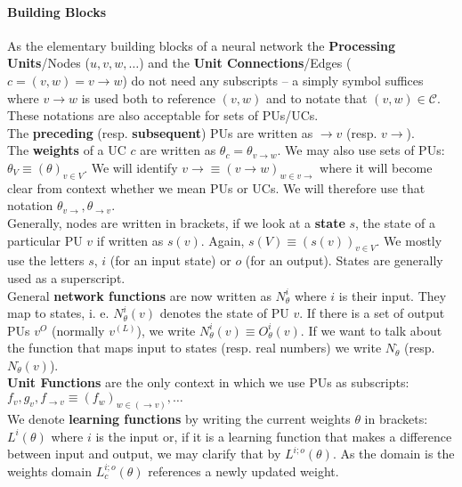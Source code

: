 \documentclass[a4paper,11pt]{article}
\begin{document}
\paragraph{Building Blocks}
As the elementary building blocks of a neural network the \textbf{Processing Units}/Nodes ($u,v,w,\dotsc$) and the \textbf{Unit Connections}/Edges ($c=(v,w)=v\to w$) do not need any subscripts -- a simply symbol suffices where $v\to w$ is used both to reference $(v,w)$ and to notate that $(v,w)\in\mathcal{C}$. These notations are also acceptable for sets of PUs/UCs.\\
The \textbf{preceding} (resp. \textbf{subsequent}) PUs are written as $\to v$ (resp. $v\to$).\\
The \textbf{weights} of a UC $c$ are written as $\theta_c=\theta_{v\to w}$. We may also use sets of PUs: $\theta_V\equiv\left(\theta\right)_{v\in V}$. We will identify $v\to\equiv\left(v\to w\right)_{w\in v\to}$ where it will become clear from context whether we mean PUs or UCs. We will therefore use that notation $\theta_{v\to},\theta_{\to v}$.\\
Generally, nodes are written in brackets, if we look at a \textbf{state} $s$, the state of a particular PU $v$ if written as $s(v)$. Again, $s(V)\equiv\left(s(v)\right)_{v\in V}$. We mostly use the letters $s$, $i$ (for an input state) or $o$ (for an output). States are generally used as a superscript.\\
General \textbf{network functions} are now written as $N^i_{\theta}$ where $i$ is their input. They map to states, i. e. $N^i_{\theta}(v)$ denotes the state of PU $v$. If there is a set of output PUs $v^{O}$ (normally $v^{(L)}$), we write $N^i_{\theta}(v)\equiv O^i_{\theta}(v)$. If we want to talk about the function that maps input to states (resp. real numbers) we write $N^{\cdot}_{\theta}$ (resp. $N^{\cdot}_{\theta}(v)$).\\
\textbf{Unit Functions} are the only context in which we use PUs as subscripts: $f_v,g_v,f_{\to v}\equiv\left(f_w\right)_{w\in(\to v)},\dotsc$\\
We denote \textbf{learning functions} by writing the current weights $\theta$ in brackets: $L^i(\theta)$ where $i$ is the input or, if it is a learning function that makes a difference between input and output, we may clarify that by $L^{i;o}(\theta)$. As the domain is the weights domain $L^{i;o}_c(\theta)$ references a newly updated weight.
\end{document}
